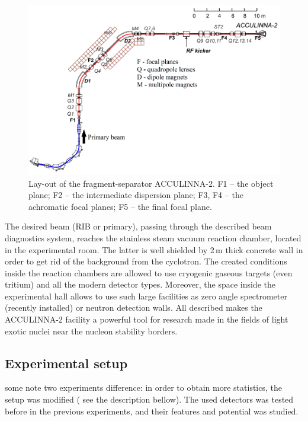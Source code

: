 \begin{figure}[t]
	\begin{center}
		\includegraphics[width=1\textwidth]{figures/acculinna2.png}
	\end{center}
	\caption{Lay-out of the fragment-separator ACCULINNA-2. F1 – the object plane; F2 – the intermediate dispersion plane; F3, F4 – the achromatic focal planes; F5 – the final focal plane.}
	\label{fig:acculinna2_scheme}
\end{figure}

The desired beam (RIB or primary), passing through the described beam diagnostics system, reaches the stainless steam vacuum reaction chamber, located in the experimental room.
The latter is well shielded by 2\,m thick concrete wall in order to get rid of the background from the cyclotron.
The created conditions inside the reaction chambers are allowed to use cryogenic gaseous targets (even tritium) and all the modern detector types.
Moreover, the space inside the experimental hall allows to use such large facilities as zero angle spectrometer (recently installed) or neutron detection walls.
All described makes the ACCULINNA-2 facility a powerful tool for research made in the fields of light exotic nuclei near the nucleon stability borders.

\subsection{Experimental setup}

some note
two experiments difference: in order to obtain more statistics, the setup was modified ( see the description bellow). 
The used detectors was tested before in the previous experiments, and their features and potential was studied.

